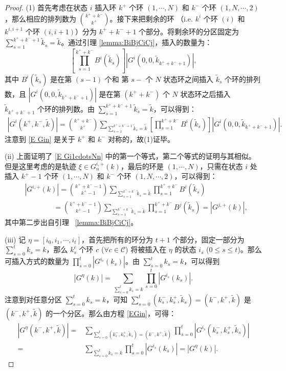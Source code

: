 \begin{proof}
	(1) 首先考虑在状态 $i$ 插入环 $k^+$ 个环 $(1,\cdots,N)$ 和 $k^-$ 个环  $(1,N,\cdots,2)$，那么相应的排列数为 $\binom{k^++k^-}{k^+}$。接下来把剩余的环 （i.e. $k^i$ 个环 $(i)$ 和 $k^{i,i+1}$ 个环 $(i,i+1)$）分为 $k^++k^-+1$ 个部分。将剩余环的分区固定为 $\sum_{s=1}^{k^++k^-+1}\tilde{k}_s=\tilde{k}$。通过引理 \ref{lemma:BiBjCiCj}，插入的数量为：
	\begin{equation*}
		\left[\prod_{s=1}^{k^++k^-}B^i(\tilde{k}_s)\right]\left|G^i(0,0,\tilde{k}_{k^++k^-+1})\right|,
	\end{equation*}
	其中 $B^i(\tilde{k}_s)$ 是在第 $(s-1)$ 个和 第 $s-$ 个 $N$ 状态环之间插入 $\tilde{k}_s$ 个环的排列数，且 $|G^i(0,0,\tilde{k}_{k^++k^-+1})|$ 是在第 $(k^++k^-)$ 个 $N$ 状态环之后插入 $\tilde{k}_{k^++k^-+1}$ 个环的排列数。由 $\sum_{s=1}^{k^++k^-+1}\tilde{k}_s=\tilde{k}$，可以得到：
	\begin{align}\label{E Gin}
		\left|G^i\left(k^+,k^-,\tilde{k}\right)\right|=\binom{k^++k^-}{k^+}\sum_{\sum_{s=1}^{k^++k^-+1}\tilde{k}_s=\tilde{k}}\left[\prod_{s=1}^{k^++k^-}B^i\left(\tilde{k}_s\right)\right]\left|G^i\left(0,0,\tilde{k}_{k^++k^-+1}\right)\right|.
	\end{align}
	注意到 \eqref{E Gin} 是关于 $k^+$ 和 $k^-$ 对称的，故(1)证毕。
	
	(ii) 上面证明了 \eqref{E Gi1cdotsNn} 中的第一个等式，第二个等式的证明与其相似。但是这里考虑的是轨迹 $\xi\in G^{i,+}_n(k)$，最后的环是 $(1,\cdots,N)$，只需在状态 $i$ 处插入 $k^+-1$ 个环 $(1,\cdots,N)$ 和 $k^-$ 个环 $(1,N,\cdots,2)$，可以得到：
	\begin{align*}
		&\left|G^{i,+}\left(k\right)\right|=\binom{k^++k^--1}{k^+-1}\sum_{\sum_{s=1}^{k^++k^-}\tilde{k}_s=\tilde{k}}\prod_{s=1}^{k^++k^-}B^i\left(\tilde{k}_s\right)\\
		&\qquad\qquad=\binom{k^++k^--1}{k^+-1}\sum_{\sum_{s=1}^{k^++k^-}\tilde{k}_s=\tilde{k}}\prod_{s=1}^{k^++k^-}B^j\left(\tilde{k}_s\right)=\left|G^{j,+}\left(k\right)\right|,
	\end{align*}
	其中第二步出自引理 ~\ref{lemma:BiBjCiCj}。

	(iii) 记 $\eta=[i_0,i_1,\cdots,i_t]$，首先把所有的环分为 $t+1$ 个部分，固定一部分为 $\sum_{s=0}^t k_s=k$，那么 $k^c_s$ 个环 $c$ ($\forall c\in\mathcal{C}$) 将被插入在 $\eta$ 的状态 $i_s$ ($0\le s\le t$)。那么可插入方式的数量为 $\prod_{s=0}^t |G^{i_s}(k_s)|$。由 $\sum_{s=0}^t k_s=k$，可以得到
	\begin{equation*}
		\left|G^{\eta}(k)\right|=\sum_{\sum_{s=0}^t k_s=k}\prod_{s=0}^t \left|G^{i_s}(k_s)\right|.
	\end{equation*}
	注意到对任意分区 $\sum_{s=0}^t k_s=k$，可知 $\sum_{s=0}^t (k_s^-,k_s^+,\tilde{k}_s)=(k^-,k^+,\tilde{k})$ 是 $(k^-,k^+,\tilde{k})$ 的一个分区。那么由方程 \eqref{EGin}，可得：
	\begin{align*}
		\left|G^{\eta}(k^-,k^+,\tilde{k})\right|=&\sum_{\sum_{s=0}^t (k_s^-,k_s^+,\tilde{k}_s)=(k^-,k^+,\tilde{k})}\prod_{s=0}^t \left|G^{i_s}(k_s^-,k_s^+,\tilde{k}_s)\right|\\
		=&\sum_{\sum_{s=0}^t k_s=k}\prod_{s=0}^t \left|G^{i_s}(k_s)\right|=\left|G^{\eta}(k)\right|.
	\end{align*}
\end{proof}
